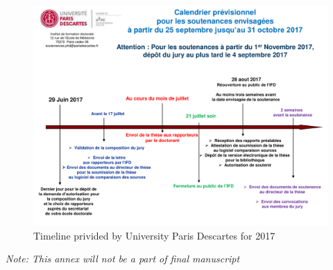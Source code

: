 \documentclass[12pt,]{book}
\theoremstyle{definition}
\theoremstyle{definition}
\theoremstyle{definition}
\theoremstyle{remark}
\begin{document}
\begin{figure}

{\centering \includegraphics[width=1\linewidth]{figures-ext/An-timeline} 

}

\caption{Timeline privided by University Paris Descartes for 2017}\label{fig:an-timeline}
\end{figure}

\emph{Note: This annex will not be a part of final manuscript}


\end{document}
